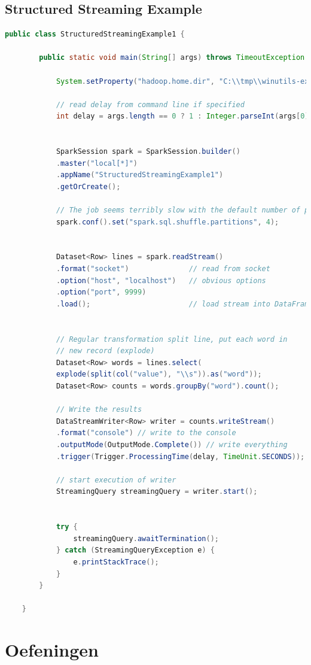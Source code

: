 \documentclass[a4paper,10pt,twoside]{report}
\begin{document}
\subsection{Structured Streaming Example}
\begin{lstlisting}[language=Java]
	public class StructuredStreamingExample1 {
		
		public static void main(String[] args) throws TimeoutException {
			
			System.setProperty("hadoop.home.dir", "C:\\tmp\\winutils-extra\\hadoop");
			
			// read delay from command line if specified
			int delay = args.length == 0 ? 1 : Integer.parseInt(args[0]);
			
			
			SparkSession spark = SparkSession.builder()
			.master("local[*]")
			.appName("StructuredStreamingExample1")
			.getOrCreate();
			
			// The job seems terribly slow with the default number of partitions
			spark.conf().set("spark.sql.shuffle.partitions", 4);
			
			
			Dataset<Row> lines = spark.readStream()
			.format("socket")              // read from socket
			.option("host", "localhost")   // obvious options
			.option("port", 9999)
			.load();                       // load stream into DataFrame
			
			
			// Regular transformation split line, put each word in 
			// new record (explode) 
			Dataset<Row> words = lines.select(
			explode(split(col("value"), "\\s")).as("word"));
			Dataset<Row> counts = words.groupBy("word").count();
			
			// Write the results
			DataStreamWriter<Row> writer = counts.writeStream()
			.format("console") // write to the console
			.outputMode(OutputMode.Complete()) // write everything
			.trigger(Trigger.ProcessingTime(delay, TimeUnit.SECONDS));
			
			// start execution of writer
			StreamingQuery streamingQuery = writer.start();   
			
			
			try {
				streamingQuery.awaitTermination();
			} catch (StreamingQueryException e) {			
				e.printStackTrace();
			}		
		}
		
	}
\end{lstlisting}


\newpage

\section{Oefeningen}
\end{document}
